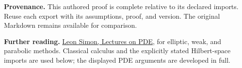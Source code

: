 \documentclass[preprint,12pt,aps,pra,showkeys,amsmath,amssymb,superscriptaddress,floatfix]{revtex4-2}
\theoremstyle{definition}
\theoremstyle{remark}
\begin{document}
\par\medskip\begingroup\small\linespread{1.0}\selectfont\noindent\textbf{Provenance.} This authored proof is complete relative to its declared imports. Reuse
each export with its assumptions, proof, and version. The original
Markdown remains available for comparison.
\par\endgroup

\par\smallskip\begingroup\small\linespread{1.0}\selectfont\noindent\textbf{Further reading.} \href{https://math.stanford.edu/~lms/lecs-on-pde.pdf}{Leon Simon,
Lectures on PDE}, for elliptic, weak, and parabolic methods. Classical
calculus and the explicitly stated Hilbert-space imports are used below;
the displayed PDE arguments are developed in full.\par\endgroup
\end{document}
